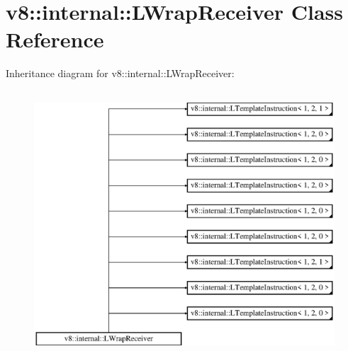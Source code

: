 \hypertarget{classv8_1_1internal_1_1_l_wrap_receiver}{}\section{v8\+:\+:internal\+:\+:L\+Wrap\+Receiver Class Reference}
\label{classv8_1_1internal_1_1_l_wrap_receiver}
Inheritance diagram for v8\+:\+:internal\+:\+:L\+Wrap\+Receiver\+:\begin{figure}[H]
\begin{center}
\leavevmode
\includegraphics[height=10.000000cm]{classv8_1_1internal_1_1_l_wrap_receiver}
\end{center}
\end{figure}

